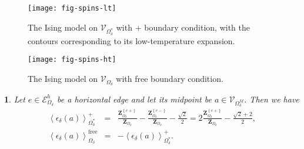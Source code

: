 \documentclass[oneside,english]{amsart}
\numberwithin{equation}{section}
\numberwithin{figure}{section}
\theoremstyle{plain}
\theoremstyle{plain}
\theoremstyle{plain}
\theoremstyle{plain}
\newtheorem{prop}[thm]{\protect\propositionname}
\theoremstyle{plain}
\theoremstyle{definition}
\theoremstyle{remark}
\providecommand{\propositionname}{Proposition}
\begin{document}
\begin{figure}
\texttt{[image: fig-spins-lt]}\caption{\label{fig:spins-lt}The Ising model on $\mathcal{V}_{\Omega_{\delta}^{*}}$
with $+$ boundary condition, with the contours corresponding to its
low-temperature expansion.}
\end{figure}


\begin{figure}
\texttt{[image: fig-spins-ht]}\caption{\label{fig:spins-ht}The Ising model on $\mathcal{V}_{\Omega_{\delta}}$
with free boundary condition.}
\end{figure}

\begin{prop}
\label{pro:contour-statistics}Let $e\in\mathcal{E}_{\Omega_{\delta}}^{h}$
be a horizontal edge and let its midpoint be $a\in\mathcal{V}_{\Omega_{\delta}^{M}}$.
Then we have 
\begin{eqnarray*}
\left\langle \epsilon_{\delta}\left(a\right)\right\rangle _{\Omega_{\delta}^{*}}^{+} & = & \frac{\mathbf{Z}_{\Omega_{\delta}}^{\left\{ e+\right\} }}{\mathbf{Z}_{\Omega_{\delta}}}-\frac{\mathbf{Z}_{\Omega_{\delta}}^{\left\{ e-\right\} }}{\mathbf{Z}_{\Omega_{\delta}}}-\frac{\sqrt{2}}{2}=2\frac{\mathbf{Z}_{\Omega_{\delta}}^{\left\{ e+\right\} }}{\mathbf{Z}_{\Omega_{\delta}}}-\frac{\sqrt{2}+2}{2},\\
\left\langle \epsilon_{\delta}\left(a\right)\right\rangle _{\Omega_{\delta}}^{\mathrm{free}} & = & -\left\langle \epsilon_{\delta}\left(a\right)\right\rangle _{\Omega_{\delta}^{*}}^{+}.
\end{eqnarray*}
\end{prop}
\end{document}

